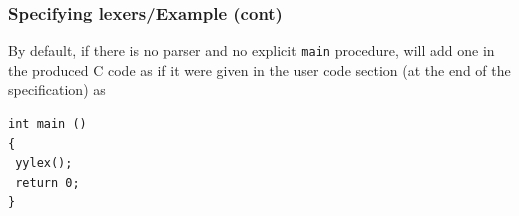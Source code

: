 %
\begin{frame}[containsverbatim]
\frametitle{Specifying lexers/Example (cont)}

By default, if there is no parser and no explicit \texttt{main}
procedure, \Lex will add one in the produced C code as if it were
given in the user code section (at the end of the specification) as
{\small
\begin{verbatim}
int main ()
{
 yylex();
 return 0;
}
\end{verbatim}
}

\end{frame}
